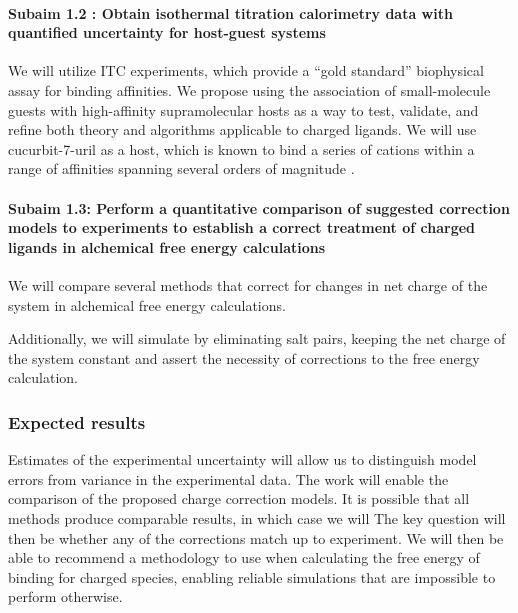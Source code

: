 \documentclass[10pt,final]{article}
\newcommand{\subsubsubsection}[1]{\paragraph*{#1}}
\begin{document}

\subsubsubsection{Subaim 1.2 : Obtain isothermal titration calorimetry data with quantified uncertainty for host-guest systems}

We will utilize ITC experiments, which provide a “gold standard” biophysical assay for binding affinities.
We propose using the association of small-molecule guests with high-affinity supramolecular hosts as a way to test, validate, and refine both theory and algorithms applicable to charged ligands.
We will use cucurbit-7-uril \cite{Lagona2005a} as a host, which is known to bind a series of cations within a range of affinities spanning several orders of magnitude \cite{Cao2013a}.

\subsubsubsection{Subaim 1.3: Perform a quantitative comparison of suggested correction models to experiments to establish a correct treatment of charged ligands in alchemical free energy calculations}
We will compare several methods that correct for changes in net charge of the system in alchemical free energy calculations\cite{Reif2013a,Rocklin2013a}.


Additionally, we will simulate by eliminating salt pairs, keeping the net charge of the system constant and assert the necessity of corrections to the free energy calculation.

\subsubsection*{Expected results}
Estimates of the experimental uncertainty will allow us to distinguish model errors from variance in the experimental data.
The work will enable the comparison of the proposed charge correction models. It is possible that all methods produce comparable results, in which case we will
The key question will then be whether any of the corrections  match up to experiment.
We will then be able to recommend a methodology to use when calculating the free energy of binding for charged species, enabling reliable simulations that are impossible to perform otherwise.
\end{document}
